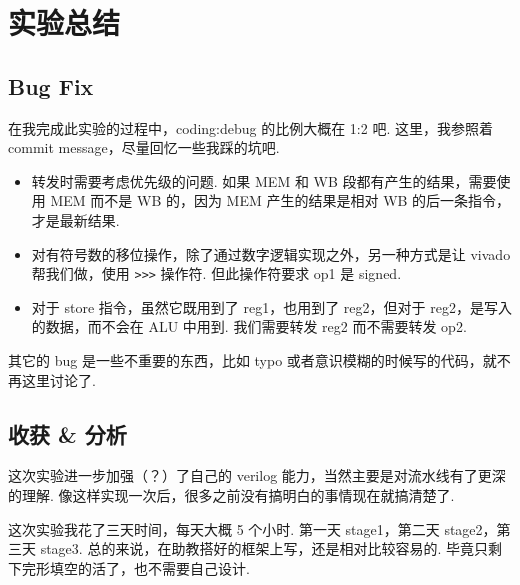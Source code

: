 \documentclass{article}
\begin{document}
\section{实验总结}
\subsection{Bug Fix}
在我完成此实验的过程中，coding:debug 的比例大概在 1:2 吧. 这里，我参照着 commit message，尽量回忆一些我踩的坑吧.
\begin{itemize}
  \item
    转发时需要考虑优先级的问题. 如果 MEM 和 WB 段都有产生的结果，需要使用 MEM 而不是 WB 的，因为 MEM 产生的结果是相对 WB 的后一条指令，才是最新结果.
  \item
    对有符号数的移位操作，除了通过数字逻辑实现之外，另一种方式是让 vivado 帮我们做，使用 \texttt{>>>} 操作符. 但此操作符要求 op1 是 signed.
  \item
    对于 store 指令，虽然它既用到了 reg1，也用到了 reg2，但对于 reg2，是写入的数据，而不会在 ALU 中用到. 我们需要转发 reg2 而不需要转发 op2.
\end{itemize}
其它的 bug 是一些不重要的东西，比如 typo 或者意识模糊的时候写的代码，就不再这里讨论了.
\subsection{收获 \& 分析}
这次实验进一步加强（？）了自己的 verilog 能力，当然主要是对流水线有了更深的理解. 像这样实现一次后，很多之前没有搞明白的事情现在就搞清楚了.

这次实验我花了三天时间，每天大概 5 个小时. 第一天 stage1，第二天 stage2，第三天 stage3. 总的来说，在助教搭好的框架上写，还是相对比较容易的. 毕竟只剩下完形填空的活了，也不需要自己设计.
\end{document}
